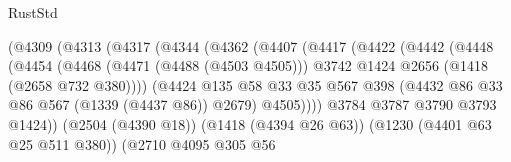 \begin{lexlean}{RustStd}
\begin{coremodule}
                                  (@4309
                                    (@4313
                                      (@4317
                                        (@4344
                                          (@4362
                                            (@4407
                                              (@4417
                                                (@4422
                                                  (@4442
                                                    (@4448
                                                      (@4454
                                                        (@4468
                                                          (@4471 (@4488 (@4503 @4505)))
                                                          @3742
                                                          @1424
                                                          @2656
                                                          (@1418 (@2658 @732 @380))))
                                                      (@4424
                                                        @135
                                                        @58
                                                        @33
                                                        @35
                                                        @567
                                                        @398
                                                        (@4432
                                                          @86
                                                          @33
                                                          @86
                                                          @567
                                                          (@1339 (@4437 @86))
                                                          @2679)
                                                        @4505))))
                                                @3784
                                                @3787
                                                @3790
                                                @3793
                                                @1424))
                                            (@2504 (@4390 @18))
                                            (@1418 (@4394 @26 @63))
                                            (@1230 (@4401 @63 @25 @511 @380))
                                            (@2710
                                              @4095
                                              @305
                                              @56

\end{coremodule}
\end{lexlean}
